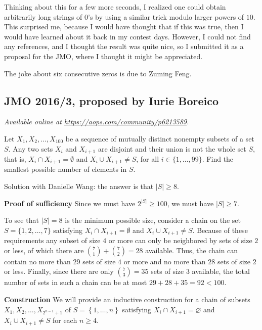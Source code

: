 \documentclass[11pt]{scrartcl}
\begin{document}
Thinking about this for a few more seconds,
I realized one could obtain arbitrarily long strings of $0$'s
by using a similar trick modulo larger powers of $10$.
This surprised me, because I would have thought that if this was true,
then I would have learned about it back in my contest days.
However, I could not find any references,
and I thought the result was quite nice,
so I submitted it as a proposal for the JMO,
where I thought it might be appreciated.

The joke about six consecutive zeros is due to Zuming Feng.
\pagebreak

\subsection{JMO 2016/3, proposed by Iurie Boreico}
\textsl{Available online at \url{https://aops.com/community/p6213589}.}
\begin{mdframed}[style=mdpurplebox,frametitle={Problem statement}]
Let $X_1, X_2, \dots, X_{100}$ be a sequence of mutually distinct nonempty subsets of a set $S$.
Any two sets $X_i$ and $X_{i+1}$ are disjoint and their
union is not the whole set $S$,
that is, $X_i\cap X_{i+1}=\emptyset$ and $X_i\cup X_{i+1}\neq S$,
for all $i\in\{1, \dots, 99\}$.
Find the smallest possible number of elements in $S$.
\end{mdframed}
Solution with Danielle Wang: the answer is that $|S| \ge 8$.

\textbf{Proof of sufficiency}
Since we must have $2^{|S|} \geq 100$, we must have $|S| \geq 7$.

To see that $|S| = 8$ is the minimum possible size,
consider a chain on the set $S = \{1, 2, \dots, 7\}$
satisfying $X_i \cap X_{i+1} = \emptyset$ and $X_i \cup X_{i+1} \neq S$.
Because of these requirements any subset of size $4$ or more
can only be neighbored by sets of size $2$ or less,
of which there are $\binom 71 + \binom 72 = 28$ available.
Thus, the chain can contain no more than $29$ sets of size $4$ or more
and no more than $28$ sets of size $2$ or less.
Finally, since there are only $\binom 73 = 35$ sets of size $3$ available,
the total number of sets in such a chain
can be at most $29 + 28 + 35 = 92 < 100$.

\textbf{Construction}
We will provide an inductive construction for a
chain of subsets $X_1, X_2, \dots, X_{2^{n-1} + 1}$
of  $S = \left\{ 1, \dots, n \right\}$
satisfying $X_i \cap X_{i+1} = \varnothing$
and $X_i \cup X_{i+1} \neq S$ for each $n \geq 4$.
\end{document}
